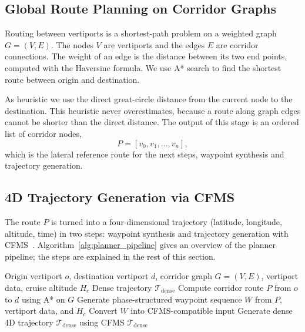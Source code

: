 \subsection{Global Route Planning on Corridor Graphs}
\label{sec:global_planning}

Routing between vertiports is a shortest-path problem on a weighted graph \(G=(V,E)\). The nodes \(V\) are vertiports and the edges \(E\) are corridor connections. The weight of an edge is the distance between its two end points, computed with the Haversine formula. We use A* search to find the shortest route between origin and destination.

As heuristic we use the direct great-circle distance from the current node to the destination. This heuristic never overestimates, because a route along graph edges cannot be shorter than the direct distance. The output of this stage is an ordered list of corridor nodes,
\[
P = [v_0, v_1, \dots, v_n],
\]
which is the lateral reference route for the next steps, waypoint synthesis and trajectory generation.

\subsection{4D Trajectory Generation via CFMS}
\label{sec:trajectory_generation}

The route \(P\) is turned into a four-dimensional trajectory (latitude, longitude, altitude, time) in two steps: waypoint synthesis and trajectory generation with CFMS~\cite{morscheck2021cfms}. Algorithm~\ref{alg:planner_pipeline} gives an overview of the planner pipeline; the steps are explained in the rest of this section.

\begin{Algorithm}
\label{alg:planner_pipeline}
\begin{algorithmic}[1]
\REQUIRE Origin vertiport \(o\), destination vertiport \(d\), corridor graph \(G=(V,E)\), vertiport data, cruise altitude \(H_c\)
\ENSURE Dense trajectory \(\mathcal{T}_{\mathrm{dense}}\)
\STATE Compute corridor route \(P\) from \(o\) to \(d\) using A* on \(G\)
\STATE Generate phase-structured waypoint sequence \(W\) from \(P\), vertiport data, and \(H_c\)
\STATE Convert \(W\) into CFMS-compatible input
\STATE Generate dense 4D trajectory \(\mathcal{T}_{\mathrm{dense}}\) using CFMS
\RETURN \(\mathcal{T}_{\mathrm{dense}}\)
\end{algorithmic}
\end{Algorithm}


